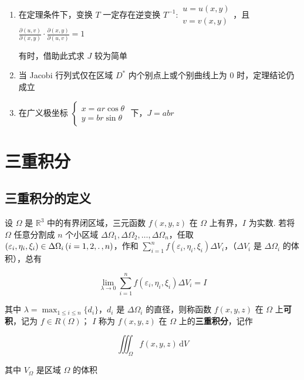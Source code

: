 \documentclass[lang = zh , final , oneside , openany , titlepage , zihao = -4 , linespread = 1.3 , baselineskip = false , cjk-font = windows , text-font = newtx , math-font = newtx , math-style = ISO , uppercase-greek = upright , integral-limits = false]{sjtureport}
\begin{document}
\begin{enumerate}
\item
  在定理条件下，变换 \(T\) 一定存在逆变换
  \(T^{-1}:\begin{aligned}u=u(x,y)\\v=v(x,y)\end{aligned}\)，且
  \(\frac{\partial (u,v)}{\partial (x,y)}\cdot \frac{\partial (x,y)}{\partial (u,v)} = 1\)

  有时，借助此式求 \(J\) 较为简单
\item
  当 Jacobi 行列式仅在区域 \(D^*\) 内个别点上或个别曲线上为 \(0\)
  时，定理结论仍成立
\item
  在广义极坐标
  \(\left\{\begin{aligned}x=ar\cos\theta\\y=br\sin\theta\end{aligned}\right.\)
  下，\(J = abr\)
\end{enumerate}

\section{三重积分}

\subsection{三重积分的定义}

\begin{definition}
    设 \(\Omega\) 是 \(\mathbb{R}^3\) 中的有界闭区域，三元函数 \(f(x,y,z)\) 在 \(\Omega\) 上有界，\(I\) 为实数. 若将 \(\Omega\) 任意分割成 \(n\) 个小区域 \(\Delta \Omega_1,\Delta\Omega_2,\ldots,\Delta\Omega_n\)，任取 \(\left(\varepsilon_i,\eta_i,\xi_i \right)\in\Delta\Omega_i\left(i=1,2,\ldotp,n\right)\)，作和 \(\displaystyle\sum_{i=1}^nf\left(\varepsilon_i,\eta_i,\xi_i \right)\Delta V_i\)，（\(\Delta V_i\) 是 \(\Delta\Omega_i\) 的体积），总有

    \[\lim_{\lambda\to 0}\sum_{i=1}^nf\left(\varepsilon_i,\eta_i,\xi_i \right)\Delta V_i = I\]

    其中 \(\lambda = \max_{1\leq i\leq n}\{d_i\}\)，\(d_i\) 是 \(\Delta\Omega_i\) 的直径，则称函数 \(f(x,y,z)\) 在 \(\Omega\) 上\textbf{可积}，记为 \(f\in R(\Omega)\)； \(I\) 称为 \(f(x,y,z)\) 在 \(\Omega\) 上的\textbf{三重积分}，记作

    \[\iiint_\Omega f(x,y,z)\,\mathrm{d}V\]

    其中 \(V_\Omega\) 是区域 \(\Omega\) 的体积
\end{definition}
\end{document}

